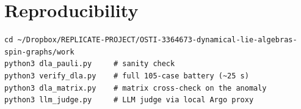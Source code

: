\documentclass[11pt]{article}
\begin{document}
\section*{Reproducibility}

\begin{verbatim}
cd ~/Dropbox/REPLICATE-PROJECT/OSTI-3364673-dynamical-lie-algebras-spin-graphs/work
python3 dla_pauli.py     # sanity check
python3 verify_dla.py    # full 105-case battery (~25 s)
python3 dla_matrix.py    # matrix cross-check on the anomaly
python3 llm_judge.py     # LLM judge via local Argo proxy
\end{verbatim}
\end{document}
